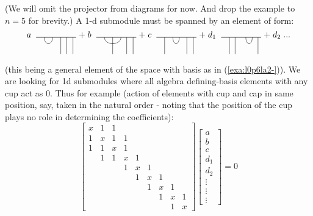 \mdef  
(We will omit the projector from diagrams for now. And drop the example to $n=5$ for brevity.) 
A 1-d submodule must be spanned by an element of form:
\[ 
\rb{\;a\;} \begin{tikzpicture}[scale=0.68]
     \draw (0,0) -- (2.43,0) ;
     \draw (1.5,0) -- (1.5,-1);
     \draw (1.85,0) -- (1.85,-1);
     \draw (2.2385,0) -- (2.2385,-1);
     \draw (.5,0) .. controls (.5,-.5) and (1.0,-.5) .. (1,0) ;
 \end{tikzpicture}
 \rb{+\;b\;} \begin{tikzpicture}[scale=0.68]
     \draw (0,0) -- (2.43,0) ;
     \draw (1,0) -- (1,-1);
     \draw (1.85,0) -- (1.85,-1);
     \draw (2.2385,0) -- (2.2385,-1);
     \draw (.5,0) .. controls (.5,-.5) and (1.5,-.5) .. (1.5,0) ;
 \end{tikzpicture}
\rb{+\;c\;} \begin{tikzpicture}[scale=0.68]
     \draw (0,0) -- (2.43,0) ;
     \draw (.5,0) -- (.5,-1);
     \draw (1.85,0) -- (1.85,-1);
     \draw (2.2385,0) -- (2.2385,-1);
     \draw (1.,0) .. controls (1.,-.5) and (1.39,-.5) .. (1.39,0) ;
      \end{tikzpicture}
 \rb{+\;d_1\;} \begin{tikzpicture}[scale=0.68]
     \draw (0,0) -- (2.43,0) ;
     \draw (.5,0) -- (.5,-1);
     \draw (.85,0) -- (.85,-1);
     \draw (2.2385,0) -- (2.2385,-1);
     \draw (1.5,0) .. controls (1.5,-.5) and (1.89,-.5) .. (1.89,0) ;
 \end{tikzpicture}
  \rb{+\; d_2 \;...\;}
\]
(this being a general element of the space with basis as in (\ref{exa:l0p6la2-})).
We are looking for 1d submodules where all algebra defining-basis elements with any cup act as 0. 
Thus for example 
(action of elements with cup and cap in same position, say, taken in the natural order 
- noting that the position of the cup plays no role in determining the coefficients):
\[
\begin{bmatrix}
   x&1& 1 \\ 1&x&1 &1 \\ 1&1&x&1 \\ &1 &1&x&1 \\ &&& 1&x&1 \\ &&&& 1&x&1 \\  &&&&& 1&x&1 \\ &&&&&& 1&x&1 \\ &&&&&&&1&x
\end{bmatrix}
\begin{bmatrix}
    a \\ b \\ c \\ d_1 \\ d_2 \\ \vdots \\ \vdots \\ \vdots
\end{bmatrix}
=0
\]
